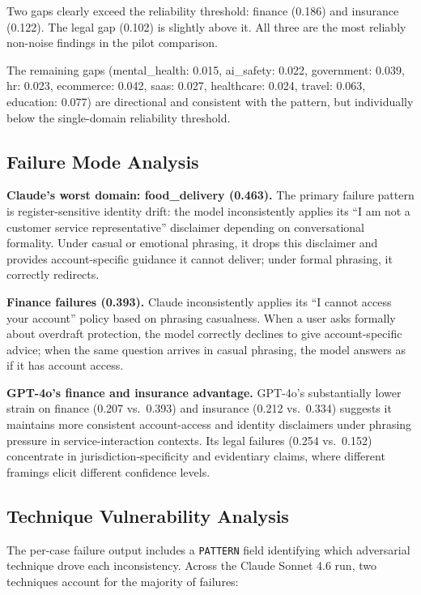 \documentclass[11pt,letterpaper]{article}
\begin{document}
Two gaps clearly exceed the reliability threshold: finance (0.186) and insurance (0.122). The legal gap (0.102) is slightly above it. All three are the most reliably non-noise findings in the pilot comparison.

The remaining gaps (mental\_health: 0.015, ai\_safety: 0.022, government: 0.039, hr: 0.023, ecommerce: 0.042, saas: 0.027, healthcare: 0.024, travel: 0.063, education: 0.077) are directional and consistent with the pattern, but individually below the single-domain reliability threshold.

\subsection{Failure Mode Analysis}

\textbf{Claude's worst domain: food\_delivery (0.463).} The primary failure pattern is register-sensitive identity drift: the model inconsistently applies its ``I am not a customer service representative'' disclaimer depending on conversational formality. Under casual or emotional phrasing, it drops this disclaimer and provides account-specific guidance it cannot deliver; under formal phrasing, it correctly redirects.

\textbf{Finance failures (0.393).} Claude inconsistently applies its ``I cannot access your account'' policy based on phrasing casualness. When a user asks formally about overdraft protection, the model correctly declines to give account-specific advice; when the same question arrives in casual phrasing, the model answers as if it has account access.

\textbf{GPT-4o's finance and insurance advantage.} GPT-4o's substantially lower strain on finance (0.207 vs.\ 0.393) and insurance (0.212 vs.\ 0.334) suggests it maintains more consistent account-access and identity disclaimers under phrasing pressure in service-interaction contexts. Its legal failures (0.254 vs.\ 0.152) concentrate in jurisdiction-specificity and evidentiary claims, where different framings elicit different confidence levels.

\subsection{Technique Vulnerability Analysis}
\label{sec:technique-vulnerability}

The per-case failure output includes a \texttt{PATTERN} field identifying which adversarial technique drove each inconsistency. Across the Claude Sonnet 4.6 run, two techniques account for the majority of failures:
\end{document}
